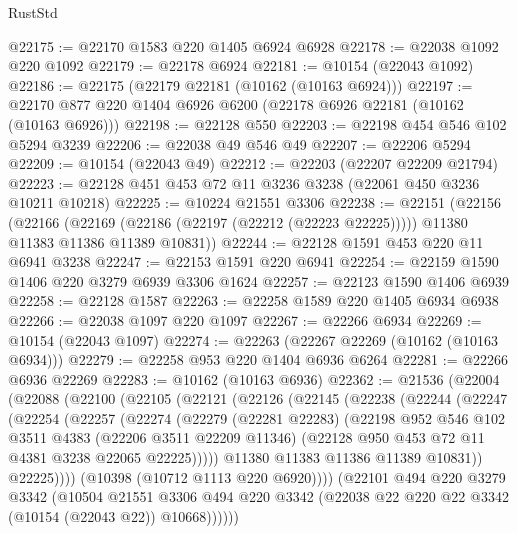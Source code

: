 \begin{lexlean}{RustStd}
\begin{coremodule}
@22175 := @22170 @1583 @220 @1405 @6924 @6928
@22178 := @22038 @1092 @220 @1092
@22179 := @22178 @6924
@22181 := @10154 (@22043 @1092)
@22186 := @22175 (@22179 @22181 (@10162 (@10163 @6924)))
@22197 := @22170 @877 @220 @1404 @6926 @6200 (@22178 @6926 @22181 (@10162 (@10163 @6926)))
@22198 := @22128 @550
@22203 := @22198 @454 @546 @102 @5294 @3239
@22206 := @22038 @49 @546 @49
@22207 := @22206 @5294
@22209 := @10154 (@22043 @49)
@22212 := @22203 (@22207 @22209 @21794)
@22223 := @22128 @451 @453 @72 @11 @3236 @3238 (@22061 @450 @3236 @10211 @10218)
@22225 := @10224 @21551 @3306
@22238 := @22151
    (@22156
      (@22166
        (@22169 (@22186 (@22197 (@22212 (@22223 @22225)))))
        @11380
        @11383
        @11386
        @11389
        @10831))
@22244 := @22128 @1591 @453 @220 @11 @6941 @3238
@22247 := @22153 @1591 @220 @6941
@22254 := @22159 @1590 @1406 @220 @3279 @6939 @3306 @1624
@22257 := @22123 @1590 @1406 @6939
@22258 := @22128 @1587
@22263 := @22258 @1589 @220 @1405 @6934 @6938
@22266 := @22038 @1097 @220 @1097
@22267 := @22266 @6934
@22269 := @10154 (@22043 @1097)
@22274 := @22263 (@22267 @22269 (@10162 (@10163 @6934)))
@22279 := @22258 @953 @220 @1404 @6936 @6264
@22281 := @22266 @6936 @22269
@22283 := @10162 (@10163 @6936)
@22362 := @21536
    (@22004
      (@22088
        (@22100
          (@22105
            (@22121
              (@22126
                (@22145
                  (@22238
                    (@22244
                      (@22247
                        (@22254
                          (@22257
                            (@22274
                              (@22279
                                (@22281 @22283)
                                (@22198
                                  @952
                                  @546
                                  @102
                                  @3511
                                  @4383
                                  (@22206 @3511 @22209 @11346)
                                  (@22128 @950 @453 @72 @11 @4381 @3238 @22065 @22225)))))
                          @11380
                          @11383
                          @11386
                          @11389
                          @10831))
                      @22225))))
              (@10398 (@10712 @1113 @220 @6920))))
          (@22101
            @494
            @220
            @3279
            @3342
            (@10504
              @21551
              @3306
              @494
              @220
              @3342
              (@22038 @22 @220 @22 @3342 (@10154 (@22043 @22)) @10668))))))

\end{coremodule}
\end{lexlean}
